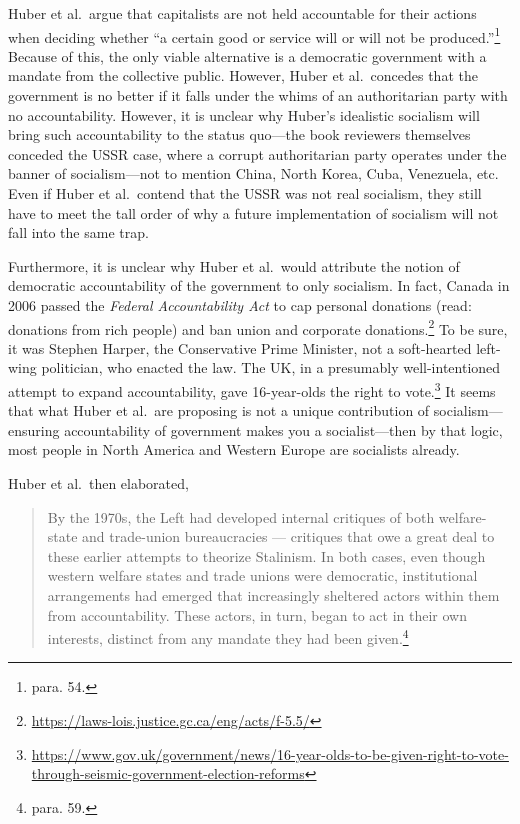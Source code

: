 \documentclass[12pt]{article}
\begin{document}
Huber et al.\ argue that capitalists are not held accountable for their actions when deciding whether ``a certain good or service will or will not be produced.''\footnote{para. 54.} Because of this, the only viable alternative is a democratic government with a mandate from the collective public. However, Huber et al.\ concedes that the government is no better if it falls under the whims of an authoritarian party with no accountability. However, it is unclear why Huber's idealistic socialism will bring such accountability to the status quo---the book reviewers themselves conceded the USSR case, where a corrupt authoritarian party operates under the banner of socialism---not to mention China, North Korea, Cuba, Venezuela, etc. Even if Huber et al.\ contend that the USSR was not real socialism, they still have to meet the tall order of why a future implementation of socialism will not fall into the same trap.

Furthermore, it is unclear why Huber et al.\ would attribute the notion of democratic accountability of the government to only socialism. In fact, Canada in 2006 passed the \textit{Federal Accountability Act} to cap personal donations (read: donations from rich people) and ban union and corporate donations.\footnote{\href{https://laws-lois.justice.gc.ca/eng/acts/f-5.5/}{https://laws-lois.justice.gc.ca/eng/acts/f-5.5/}} To be sure, it was Stephen Harper, the Conservative Prime Minister, not a soft-hearted left-wing politician, who enacted the law. The UK, in a presumably well-intentioned attempt to expand accountability, gave 16-year-olds the right to vote.\footnote{\href{https://www.gov.uk/government/news/16-year-olds-to-be-given-right-to-vote-through-seismic-government-election-reforms}{https://www.gov.uk/government/news/16-year-olds-to-be-given-right-to-vote-through-seismic-government-election-reforms}} It seems that what Huber et al.\ are proposing is not a unique contribution of socialism---ensuring accountability of government makes you a socialist---then by that logic, most people in North America and Western Europe are socialists already.

Huber et al.\ then elaborated,

\begin{quotation}
	By the 1970s, the Left had developed internal critiques of both welfare-state and trade-union bureaucracies — critiques that owe a great deal to these earlier attempts to theorize Stalinism. In both cases, even though western welfare states and trade unions were democratic, institutional arrangements had emerged that increasingly sheltered actors within them from accountability. These actors, in turn, began to act in their own interests, distinct from any mandate they had been given.\footnote{para. 59.}
\end{quotation}
\end{document}
